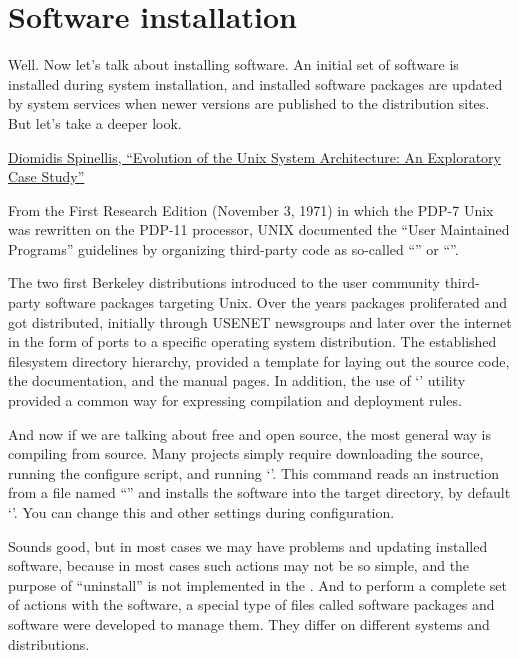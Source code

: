 \section*{Software installation} %

Well. Now let's talk about installing software. An initial set of software is
installed during system installation, and installed software packages are
updated by system services when newer versions are published to
the distribution sites. But let's take a deeper look.

\href{https://ieeexplore.ieee.org/iel7/32/4359463/08704965.pdf}%
{Diomidis Spinellis, ``Evolution of the Unix System Architecture: An Exploratory Case Study''}

From the First Research Edition (November 3, 1971) in which the PDP-7 Unix
was rewritten on the PDP-11 processor, UNIX documented the ``User Maintained
Programs'' guidelines by organizing third-party code as so-called
``'' or ``''.

The two first Berkeley distributions introduced to the user community
third-party software packages targeting Unix. Over the years packages
proliferated and got distributed, initially through USENET newsgroups and
later over the internet in the form of ports to a specific operating
system distribution. The established filesystem directory hierarchy,
provided a template for laying out the source code, the documentation,
and the manual pages. In addition, the use of `' utility provided
a common way for expressing compilation and deployment rules.

And now if we are talking about free and open source, the most general way
is compiling from source. Many projects simply require downloading the source,
running the configure script, and running `'.
This command reads an instruction from a file named ``'' and
installs the software into the target directory, by default `'.
You can change this and other settings during configuration.

Sounds good, but in most cases we may have problems  and
updating installed software, because in most cases such actions may not
be so simple, and the purpose of ``uninstall'' is not implemented in
the . And to perform a complete set of actions with
the software, a special type of files called software packages and software
were developed to manage them. They differ on different systems and
distributions.

